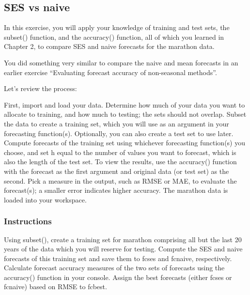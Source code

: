 \documentclass[
  letterpaper,
  DIV=11,
  numbers=noendperiod]{scrartcl}
\begin{document}
\hypertarget{ses-vs-naive}{%
\subsection{SES vs naive}\label{ses-vs-naive}}

In this exercise, you will apply your knowledge of training and test
sets, the subset() function, and the accuracy() function, all of which
you learned in Chapter 2, to compare SES and naive forecasts for the
marathon data.

You did something very similar to compare the naive and mean forecasts
in an earlier exercise ``Evaluating forecast accuracy of non-seasonal
methods''.

Let's review the process:

First, import and load your data. Determine how much of your data you
want to allocate to training, and how much to testing; the sets should
not overlap. Subset the data to create a training set, which you will
use as an argument in your forecasting function(s). Optionally, you can
also create a test set to use later. Compute forecasts of the training
set using whichever forecasting function(s) you choose, and set h equal
to the number of values you want to forecast, which is also the length
of the test set. To view the results, use the accuracy() function with
the forecast as the first argument and original data (or test set) as
the second. Pick a measure in the output, such as RMSE or MAE, to
evaluate the forecast(s); a smaller error indicates higher accuracy. The
marathon data is loaded into your workspace.

\hypertarget{instructions-9}{%
\subsubsection{Instructions}\label{instructions-9}}

Using subset(), create a training set for marathon comprising all but
the last 20 years of the data which you will reserve for testing.
Compute the SES and naive forecasts of this training set and save them
to fcses and fcnaive, respectively. Calculate forecast accuracy measures
of the two sets of forecasts using the accuracy() function in your
console. Assign the best forecasts (either fcses or fcnaive) based on
RMSE to fcbest.
\end{document}
